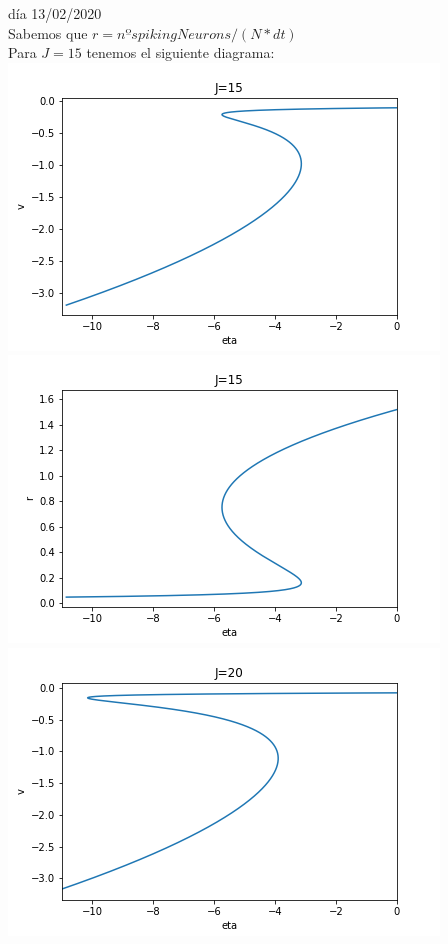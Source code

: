 \documentclass[a4paper]{article}
\begin{document}
día 13/02/2020\\
Sabemos que $r = nºspiking Neurons/(N*dt)$\\
Para $J = 15$ tenemos el siguiente diagrama:\\
\includegraphics[scale=0.7]{v_vs_eta_J15.png}\\
\includegraphics[scale=0.7]{r_vs_eta_J15.png}\\
\includegraphics[scale=0.7]{v_vs_eta_J20.png}\\
\end{document}
